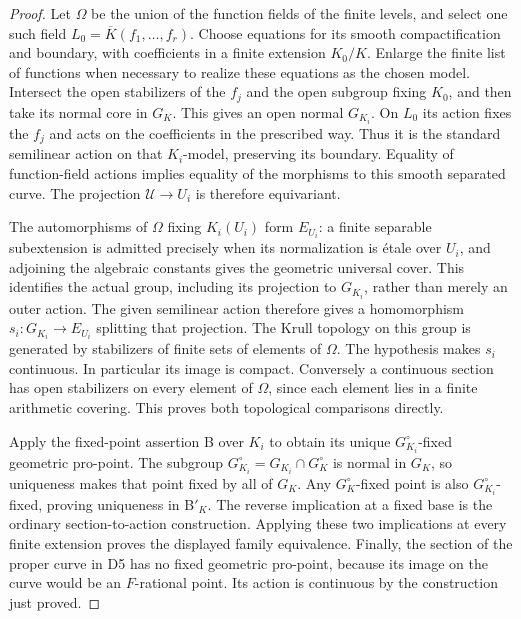 \documentclass[11pt,a4paper]{article}
\begin{document}
\begin{proof}
Let $\Omega$ be the union of the function fields of the finite levels,
and select one such field $L_0=\overline K(f_1,\ldots,f_r)$.
Choose equations for its smooth compactification and boundary, with
coefficients in a finite extension $K_0/K$.  Enlarge the finite list of
functions when necessary to realize these equations as the chosen
model.  Intersect the open stabilizers of the $f_j$ and the open
subgroup fixing $K_0$, and then take its normal core in $G_K$.
This gives an open normal $G_{K_i}$.  On $L_0$ its action fixes the
$f_j$ and acts on the coefficients in the prescribed way.  Thus it
is the standard semilinear action on that $K_i$-model, preserving its
boundary.  Equality of function-field actions implies equality of the
morphisms to this smooth separated curve.  The projection
$\mathcal U\to U_i$ is therefore equivariant.

The automorphisms of $\Omega$ fixing $K_i(U_i)$ form $E_{U_i}$: a
finite separable subextension is admitted precisely when its
normalization is \'etale over $U_i$, and adjoining the algebraic
constants gives the geometric universal cover.  This identifies the
actual group, including its projection to $G_{K_i}$, rather than merely
an outer action.  The given semilinear action therefore gives a
homomorphism $s_i:G_{K_i}\to E_{U_i}$ splitting that projection.
The Krull topology on this group is generated by stabilizers of finite
sets of elements of $\Omega$.  The hypothesis makes $s_i$ continuous.
In particular its image is compact.  Conversely a continuous section
has open stabilizers on every element of $\Omega$, since each element
lies in a finite arithmetic covering.  This proves both topological
comparisons directly.

Apply the fixed-point assertion B over $K_i$ to obtain its unique
$G_{K_i}^\circ$-fixed geometric pro-point.  The subgroup
$G_{K_i}^\circ=G_{K_i}\cap G_K^\circ$ is normal in $G_K$, so uniqueness
makes that point fixed by all of $G_K$.  Any $G_K^\circ$-fixed point
is also $G_{K_i}^\circ$-fixed, proving uniqueness in B$'_K$.
The reverse implication at a fixed base is the ordinary
section-to-action construction.  Applying these two implications at
every finite extension proves the displayed family equivalence.
Finally, the section of the proper curve in D5 has no fixed geometric
pro-point, because its image on the curve would be an $F$-rational
point.  Its action is continuous by the construction just proved.
\end{proof}
\end{document}
